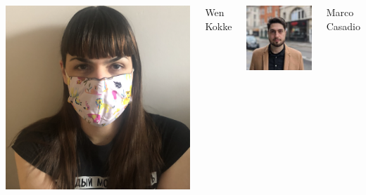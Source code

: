 \documentclass[t,compress,aspectratio=169]{beamer}
\begin{document}
\begin{frame}
\begin{columns}
    \centering
	\vspace{-1em}
	
	\includegraphics[width=\picwidth]{img/Wen.png}
    \begin{block}
    {\centering \footnotesize{Wen Kokke}}
    \end{block}
    
  	\includegraphics[width=\picwidth]{img/Marco.jpg}
    \begin{block}
    {\centering\footnotesize{Marco Casadio}}
    \end{block}

    \centering
	\vspace{-1em}
	

\end{columns}
\end{frame}
\end{document}
